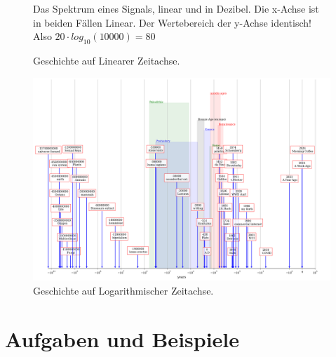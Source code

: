 \begin{figure}[h!]
    \centering
    
    \caption{Das Spektrum eines Signals, linear und in Dezibel. Die x-Achse ist in beiden Fällen Linear. Der Wertebereich der y-Achse identisch! Also $20\cdot log_{10}(10000) = 80$}
    \label{fig:figure1}
\end{figure}


\begin{figure}[h!]
    \centering
    
    \caption{Geschichte auf Linearer Zeitachse.}
    \label{fig:time_lin}
\end{figure}


\newpage
\begin{figure}[h!]
    \centering
    \includegraphics[height=\textwidth, angle=90]{img/time_log.png}
    \caption{Geschichte auf Logarithmischer Zeitachse.}
    \label{fig:time_log}
\end{figure}





\section{Aufgaben und Beispiele}

